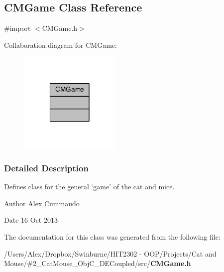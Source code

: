 \subsection{C\-M\-Game Class Reference}
\label{class_c_m_game}


{\ttfamily \#import $<$C\-M\-Game.\-h$>$}



Collaboration diagram for C\-M\-Game\-:
\nopagebreak
\begin{figure}[H]
\begin{center}
\leavevmode
\includegraphics[width=138pt]{class_c_m_game__coll__graph}
\end{center}
\end{figure}


\subsubsection{Detailed Description}
Defines class for the general `game' of the cat and mice. 

\begin{DoxyAuthor}{Author}
Alex Cummaudo 
\end{DoxyAuthor}
\begin{DoxyDate}{Date}
16 Oct 2013 
\end{DoxyDate}


The documentation for this class was generated from the following file\-:\begin{DoxyCompactItemize}
\item 
/\-Users/\-Alex/\-Dropbox/\-Swinburne/\-H\-I\-T2302 -\/ O\-O\-P/\-Projects/\-Cat and Mouse/\#2\-\_\-\-Cat\-Mouse\-\_\-\-Obj\-C\-\_\-\-D\-E\-Coupled/src/{\bf C\-M\-Game.\-h}\end{DoxyCompactItemize}
